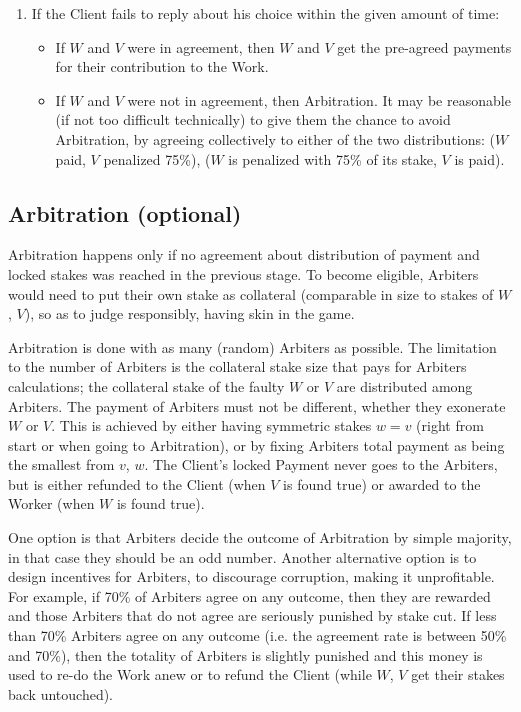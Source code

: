 \documentclass{article}
\begin{document}
\begin{enumerate}
    \item If the Client fails to reply about his choice within the given amount of time: 
        \begin{itemize}
            \item If $W$ and $V$ were in agreement, then $W$ and $V$ get the pre-agreed payments for their contribution to the Work.
            
            \item If $W$ and $V$ were not in agreement, then Arbitration. It may be reasonable (if not too difficult technically) to give them the chance to avoid Arbitration, by agreeing collectively to either of the two distributions: ($W$ paid, $V$ penalized 75\%), ($W$ is penalized with 75\% of its stake, $V$ is paid).
        \end{itemize}
\end{enumerate}

\subsection{Arbitration (optional)}
\label{arbitration}

Arbitration happens only if no agreement about distribution of payment and locked stakes was reached in the previous stage. To become eligible, Arbiters would need to put their own stake as collateral (comparable in size to stakes of $W$, $V$), so as to judge responsibly, having skin in the game.

Arbitration is done with as many (random) Arbiters as possible. The limitation to the number of Arbiters is the collateral stake size that pays for Arbiters calculations; the collateral stake of the faulty $W$ or $V$ are distributed among Arbiters. The payment of Arbiters must not be different, whether they exonerate $W$ or $V$. This is achieved by either having symmetric stakes $w=v$ (right from start or when going to Arbitration), or by fixing Arbiters total payment as being the smallest from $v$, $w$. The Client's locked Payment never goes to the Arbiters, but is either refunded to the Client (when $V$ is found true) or awarded to the Worker (when $W$ is found true). 

One option is that Arbiters decide the outcome of Arbitration by simple majority, in that case they should be an odd number. Another alternative option is to design incentives for Arbiters, to discourage corruption, making it unprofitable. For example, if 70\% of Arbiters agree on any outcome, then they are rewarded and those Arbiters that do not agree are seriously punished by stake cut. If less than 70\% Arbiters agree on any outcome (i.e. the agreement rate is between 50\% and 70\%), then the totality of Arbiters is slightly punished and this money is used to re-do the Work anew or to refund the Client (while $W$, $V$ get their stakes back untouched).
\end{document}
